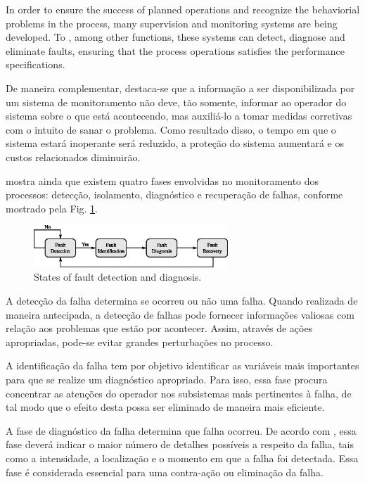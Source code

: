 \documentclass[10pt,fleqn,a4paper]{article}
\begin{document}
In order to ensure the success of planned operations and recognize the
behaviorial problems in the process, many supervision and monitoring systems are
being developed. To \citet{chiang:2001}, among other functions, these systems
can detect, diagnose and eliminate faults, ensuring that the process operations
satisfies the performance specifications.

De maneira complementar, destaca-se que a informação a ser disponibilizada por
um sistema de monitoramento não deve, tão somente, informar ao operador do
sistema sobre o que está acontecendo, mas auxiliá-lo a tomar medidas corretivas
com o intuito de sanar o problema. Como resultado disso, o tempo em que o
sistema estará inoperante será reduzido, a proteção do sistema aumentará e os
custos relacionados diminuirão.

\citet{chiang:2001} mostra ainda que existem quatro fases envolvidas no
monitoramento dos processos: detecção, isolamento, diagnóstico e recuperação de
falhas, conforme mostrado pela Fig. \ref{fig:states}.

\begin{figure}[htb]
\centering
    \includegraphics[width=0.65\textwidth]{imgs/states}
    \caption{States of fault detection and diagnosis.}
    \label{fig:states}
\end{figure}

A detecção da falha determina se ocorreu ou não uma falha. Quando realizada de
maneira antecipada, a detecção de falhas pode fornecer informações valiosas com
relação aos problemas que estão por acontecer. Assim, através de ações
apropriadas, pode-se evitar grandes perturbações no processo.

A identificação da falha tem por objetivo identificar as variáveis mais
importantes para que se realize um diagnóstico apropriado. Para isso, essa fase
procura concentrar as atenções do operador nos subsistemas mais pertinentes à
falha, de tal modo que o efeito desta possa ser eliminado de maneira mais
eficiente.

A fase de diagnóstico da falha determina que falha ocorreu. De acordo com
\citet{isermann:2004}, essa fase deverá indicar o maior número de detalhes
possíveis a respeito da falha, tais como a intensidade, a localização e o
momento em que a falha foi detectada. Essa fase é considerada essencial para uma
contra-ação ou eliminação da falha.
\end{document}
